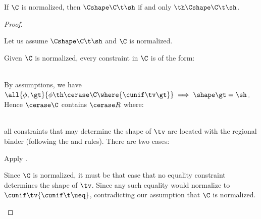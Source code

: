 \documentclass[acmsmall,screen,nonacm%
\Anonymous{,anonymous}{}%
\Final{}{,review}%
]{acmart}
\begin{document}
\begin{lemma}
  \label{lem:unicity-completeness}

  If $\C$ is normalized, then $\Cshape \C \t \sh$ if and only $\th \Cshape \C \t \sh$.
  \begin{proof}~
    \begin{proofcases}

      \proofcase{$\implies$}
        \newcommand{\NC}{R}

        Let us assume $\Cshape \C \t \sh$ and $\C$ is normalized.

        Given $\C$ is normalized, every constraint in $\C$ is of the form: \\

        \begin{bnfgrammar}
          \entry[]{\NC}{
            \bar{\hat\ueq}
            \cand \overline{\cmatch \tv \cbrs}
            \cand \cexists {\overline{\inst^\x}} {\overline{\cpapp \x \tvb \tvc \inst}}
            \cand \overline{\cletr \x \tvd \tvds {\NC_1} {\NC_2}}
          }
        \end{bnfgrammar}
        \\

        By assumptions, we have $\all {\phi, \gt} {\phi \th \cerase
        \C\where{\cunif \tv \gt}} \implies \shape \gt = \sh$. Hence $\cerase
        \C$ contains $\cerase \NC$ where: \\

        \begin{bnfgrammar}
          \entry[]{\cerase \NC}{
            \bar{\hat\ueq}
            \cand \cexists {\overline{\inst^\x}} {\overline{\cpapp \x \tvb \tvc \inst}}
            \cand \overline{\cletr \x \tvd \tvds {\cerase {\NC_1}} {\cerase {\NC_2}}}
          }
        \end{bnfgrammar}
        \\

        \Wlog all constraints that may determine the shape of $\tv$ are located
        with the regional binder (following the  and
         rules). There are two cases:

        \begin{proofcases}

          \proofcase{$\cunif \tv {\cunif \t \ueq} \in \bar{\hat\ueq}$} Apply .



            Since $\C$ is normalized, it must be that case that no equality
            constraint determines the shape of $\tv$. Since any such equality
            would normalize to $\cunif \tv {\cunif \t \ueq}$, contradicting our
            assumption that $\C$ is normalized.


\end{proofcases}
\end{proofcases}
\end{proof}
\end{lemma}
\end{document}
